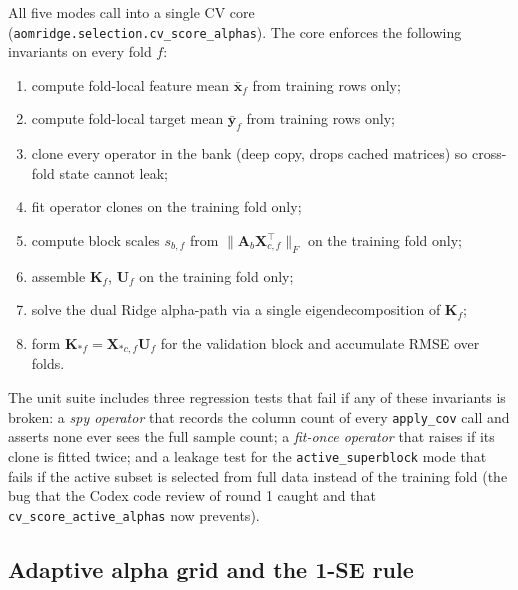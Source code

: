 \documentclass[11pt,a4paper]{article}
\newcommand{\Xmat}{\mathbf{X}}
\newcommand{\Amat}{\mathbf{A}}
\newcommand{\Kmat}{\mathbf{K}}
\newcommand{\Umat}{\mathbf{U}}
\newcommand{\xvec}{\mathbf{x}}
\newcommand{\yvec}{\mathbf{y}}
\begin{document}
All five modes call into a single CV core
(\texttt{aomridge.selection.cv\_score\_alphas}). The core enforces
the following invariants on every fold $f$:
\begin{enumerate}[leftmargin=2em,label=(\roman*)]
  \item compute fold-local feature mean
        $\bar{\xvec}_f$ from training rows only;
  \item compute fold-local target mean
        $\bar{\yvec}_f$ from training rows only;
  \item clone every operator in the bank (deep copy, drops cached
        matrices) so cross-fold state cannot leak;
  \item fit operator clones on the training fold only;
  \item compute block scales $s_{b,f}$ from
        $\|\Amat_b\Xmat_{c,f}^\top\|_F$ on the training fold only;
  \item assemble $\Kmat_f$, $\Umat_f$ on the training fold only;
  \item solve the dual Ridge alpha-path via a single
        eigendecomposition of $\Kmat_f$;
  \item form $\Kmat_{*f}=\Xmat_{*c,f}\Umat_f$ for the validation
        block and accumulate RMSE over folds.
\end{enumerate}
The unit suite includes three regression tests that fail if any of
these invariants is broken: a \emph{spy operator} that records the
column count of every \texttt{apply\_cov} call and asserts none ever
sees the full sample count; a \emph{fit-once operator} that raises if
its clone is fitted twice; and a leakage test for the
\texttt{active\_superblock} mode that fails if the active subset is
selected from full data instead of the training fold (the bug that
the Codex code review of round 1 caught and that
\texttt{cv\_score\_active\_alphas} now prevents).

\subsection{Adaptive alpha grid and the 1-SE rule}\label{sec:method-alpha}
\end{document}
